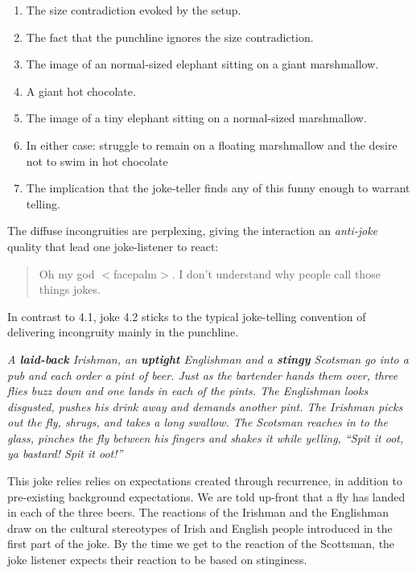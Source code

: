 \documentclass[a4]{scrartcl}
\begin{document}
\begin{enumerate}
  \item The size contradiction evoked by the setup.
  \item The fact that the punchline ignores the size contradiction.
  \item The image of an normal-sized elephant sitting on a giant marshmallow.
  \item A giant hot chocolate. 
  \item The image of a tiny elephant sitting on a normal-sized marshmallow.
  \item In either case: struggle to remain on a floating marshmallow and the desire not to swim in hot chocolate 
  \item The implication that the joke-teller finds any of this funny enough to warrant telling.
\end{enumerate}
The diffuse incongruities are perplexing, giving the interaction an \emph{anti-joke} quality
that lead one joke-listener to react:

\begin{quote}
Oh my god $<$facepalm$>$. I don't understand why people call those things jokes.
\end{quote}

In contrast to 4.1, joke 4.2 sticks to the typical joke-telling convention
of delivering incongruity mainly in the punchline.

\begin{center}
\begin{tcolorbox}[title=Joke 4.2B]
  \textit{A \textbf{laid-back} Irishman, an \textbf{uptight} Englishman and a \textbf{stingy} Scotsman go into a pub and each order a pint of beer. Just as the bartender hands them over, three flies buzz down and one lands in each of the pints. The Englishman looks disgusted, pushes his drink away and demands another pint. The Irishman picks out the fly, shrugs, and takes a long swallow. The Scotsman reaches in to the glass, pinches the fly between his fingers and shakes it while yelling, ``Spit it oot, ya bastard! Spit it oot!''}
\end{tcolorbox}
\end{center}

This joke relies relies on expectations created through recurrence,
in addition to pre-existing background expectations.
We are told up-front that a fly has landed in each of the three beers.
The reactions of the Irishman and the Englishman draw on the cultural stereotypes 
of Irish and English people introduced in the first part of the joke.
By the time we get to the reaction of the Scottsman,
the joke listener expects their reaction to be based on stinginess.
\end{document}
